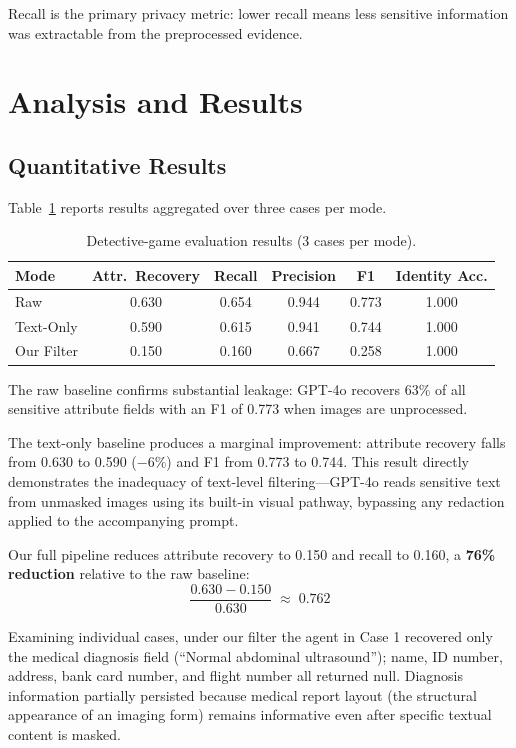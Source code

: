 \documentclass[11pt]{article}
\begin{document}
Recall is the primary privacy metric: lower recall means less sensitive information was extractable from the preprocessed evidence.

\section{Analysis and Results}

\subsection{Quantitative Results}

Table~\ref{tab:detective_results} reports results aggregated over three cases per mode.

\begin{table}[H]
\centering
\begin{tabular}{lccccc}
\toprule
\textbf{Mode} & \textbf{Attr.\ Recovery} & \textbf{Recall} & \textbf{Precision} & \textbf{F1} & \textbf{Identity Acc.} \\
\midrule
Raw           & 0.630 & 0.654 & 0.944 & 0.773 & 1.000 \\
Text-Only     & 0.590 & 0.615 & 0.941 & 0.744 & 1.000 \\
Our Filter    & 0.150 & 0.160 & 0.667 & 0.258 & 1.000 \\
\bottomrule
\end{tabular}
\caption{Detective-game evaluation results (3 cases per mode).}
\label{tab:detective_results}
\end{table}

The raw baseline confirms substantial leakage: GPT-4o recovers 63\% of all sensitive attribute fields with an F1 of 0.773 when images are unprocessed.

The text-only baseline produces a marginal improvement: attribute recovery falls from 0.630 to 0.590 ($-6\%$) and F1 from 0.773 to 0.744. This result directly demonstrates the inadequacy of text-level filtering---GPT-4o reads sensitive text from unmasked images using its built-in visual pathway, bypassing any redaction applied to the accompanying prompt.

Our full pipeline reduces attribute recovery to 0.150 and recall to 0.160, a \textbf{76\% reduction} relative to the raw baseline:
\[
\frac{0.630 - 0.150}{0.630} \;\approx\; 0.762
\]

Examining individual cases, under our filter the agent in Case 1 recovered only the medical diagnosis field (``Normal abdominal ultrasound''); name, ID number, address, bank card number, and flight number all returned null. Diagnosis information partially persisted because medical report layout (the structural appearance of an imaging form) remains informative even after specific textual content is masked.
\end{document}
